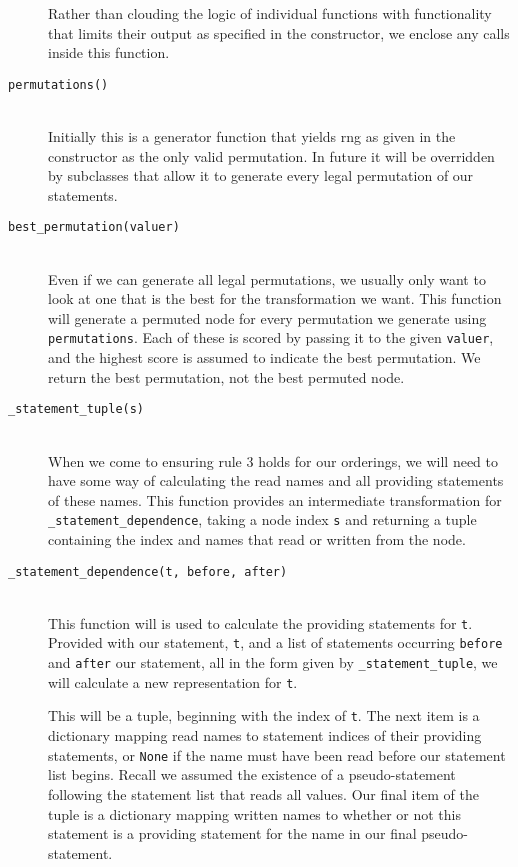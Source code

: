 \documentclass[twoside,a4paper]{report}
\begin{document}
\begin{description}
Rather than clouding the logic of individual functions with functionality that limits their output as specified in the constructor, we enclose any calls
inside this function.

\item[\texttt{permutations()}] \hfill \\
Initially this is a generator function that yields rng as given in the constructor as the only valid permutation. In future it will be overridden by
subclasses that allow it to generate every legal permutation of our statements.

\item[\texttt{best\_permutation(valuer)}] \hfill \\
Even if we can generate all legal permutations, we usually only want to look at one that is the best for the transformation we want. This function
will generate a permuted node for every permutation we generate using \texttt{permutations}. Each of these is scored by passing it to the given
\texttt{valuer}, and the highest score is assumed to indicate the best permutation. We return the best permutation, not the best permuted node.

\item[\texttt{\_statement\_tuple(s)}] \hfill \\
When we come to ensuring rule 3 holds for our orderings, we will need to have some way of calculating the read names and all providing statements
of these names. This function provides an intermediate transformation for \texttt{\_statement\_dependence}, taking a node index \texttt{s} and
returning a tuple containing the index and names that read or written from the node.

\item[\texttt{\_statement\_dependence(t, before, after)}] \hfill \\
This function will is used to calculate the providing statements for \texttt{t}. Provided with our statement, \texttt{t}, and a list of statements
occurring \texttt{before} and \texttt{after} our statement, all in the form given by \texttt{\_statement\_tuple}, we will calculate a new representation
for \texttt{t}.

This will be a tuple, beginning with the index of \texttt{t}. The next item is a dictionary mapping read names to statement indices of their providing
statements, or \texttt{None} if the name must have been read before our statement list begins. Recall we assumed the existence of a pseudo-statement
following the statement list that reads all values. Our final item of the tuple is a dictionary mapping written names to whether or not this statement
is a providing statement for the name in our final pseudo-statement.
\end{description}
\end{document}
